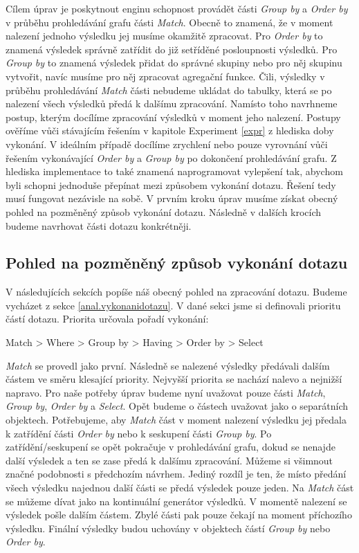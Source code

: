 Cílem úprav je poskytnout enginu schopnost provádět části \textit{Group by} a \textit{Order by} v průběhu prohledávání grafu části \textit{Match}.
Obecně to znamená, že v moment nalezení jednoho výsledku jej musíme okamžitě zpracovat.
Pro \textit{Order by} to znamená výsledek správně zatřídit do již setříděné posloupnosti výsledků.
Pro \textit{Group by} to znamená výsledek přidat do správné skupiny nebo pro něj skupinu vytvořit, navíc musíme pro něj zpracovat agregační funkce. 
Čili, výsledky v průběhu prohledávání \textit{Match} části nebudeme ukládat do tabulky, která se po nalezení všech výsledků předá k dalšímu zpracování.
Namísto toho navrhneme postup, kterým docílíme zpracování výsledků v moment jeho nalezení.
Postupy ověříme vůči stávajícím řešením v kapitole Experiment \ref{expr} z hlediska doby vykonání.
V ideálním případě docílíme zrychlení nebo pouze vyrovnání vůči řešením vykonávající \textit{Order by} a \textit{Group by} po dokončení prohledávání grafu.
Z hlediska implementace to také znamená naprogramovat vylepšení tak, abychom byli schopni jednoduše přepínat mezi způsobem vykonání dotazu.
Řešení tedy musí fungovat nezávisle na sobě. 
V prvním kroku úprav musíme získat obecný pohled na pozměněný způsob vykonání dotazu.
Následně v dalších krocích budeme navrhovat části dotazu konkrétněji.

\subsection{Pohled na pozměněný způsob vykonání dotazu}

V následujících sekcích popíše náš obecný pohled na zpracování dotazu.
Budeme vycházet z sekce \ref{anal.vykonanidotazu}.
V dané sekci jsme si definovali prioritu částí dotazu.
Priorita určovala pořadí vykonání:
\begin{code}
Match > Where > Group by > Having > Order by > Select
\end{code}
\textit{Match} se provedl jako první.
Následně se nalezené výsledky předávali dalším částem ve směru klesající priority.
Nejvyšší priorita se nachází nalevo a nejnižší napravo.
Pro naše potřeby úprav budeme nyní uvažovat pouze části \textit{Match}, \textit{Group by}, \textit{Order by} a \textit{Select}.
Opět budeme o částech uvažovat jako o separátních objektech.
Potřebujeme, aby \textit{Match} část v moment nalezení výsledku jej předala k zatřídění části \textit{Order by} nebo k seskupení části \textit{Group by}.
Po zatřídění/seskupení se opět pokračuje v prohledávání grafu, dokud se nenajde další výsledek a ten se zase předá k dalšímu zpracování.
Můžeme si všimnout značné podobnosti s předchozím návrhem. 
Jediný rozdíl je ten, že místo předání všech výsledku najednou další části se předá výsledek pouze jeden.
Na \textit{Match} část se můžeme dívat jako na kontinuální generátor výsledků. 
V momentě nalezení se výsledek pošle dalším částem.
Zbylé části pak pouze čekají na moment příchozího výsledku.
Finální výsledky budou uchovány v objektech částí \textit{Group by} nebo \textit{Order by}. 


